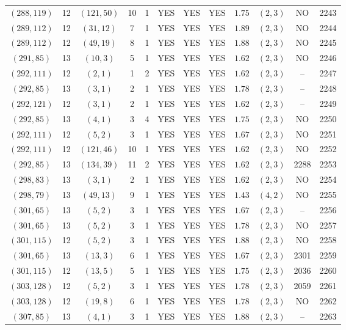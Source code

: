 \begin{longtable}{|c|c|c|c|c|c|c|c|c|c|c|c|}
$(288,119)$ & 12 & $(121,50)$ & 10 & 1 & YES & YES & YES & $1.75$ & $(2,3)$ & NO & 2243\\
$(289,112)$ & 12 & $(31,12)$ & 7 & 1 & YES & YES & YES & $1.89$ & $(2,3)$ & NO & 2244\\
$(289,112)$ & 12 & $(49,19)$ & 8 & 1 & YES & YES & YES & $1.88$ & $(2,3)$ & NO & 2245\\
$(291,85)$ & 13 & $(10,3)$ & 5 & 1 & YES & YES & YES & $1.62$ & $(2,3)$ & NO & 2246\\
$(292,111)$ & 12 & $(2,1)$ & 1 & 2 & YES & YES & YES & $1.62$ & $(2,3)$ & -- & 2247\\
$(292,85)$ & 13 & $(3,1)$ & 2 & 1 & YES & YES & YES & $1.78$ & $(2,3)$ & -- & 2248\\
$(292,121)$ & 12 & $(3,1)$ & 2 & 1 & YES & YES & YES & $1.62$ & $(2,3)$ & -- & 2249\\
$(292,85)$ & 13 & $(4,1)$ & 3 & 4 & YES & YES & YES & $1.75$ & $(2,3)$ & NO & 2250\\
$(292,111)$ & 12 & $(5,2)$ & 3 & 1 & YES & YES & YES & $1.67$ & $(2,3)$ & NO & 2251\\
$(292,111)$ & 12 & $(121,46)$ & 10 & 1 & YES & YES & YES & $1.62$ & $(2,3)$ & NO & 2252\\
$(292,85)$ & 13 & $(134,39)$ & 11 & 2 & YES & YES & YES & $1.62$ & $(2,3)$ & 2288 & 2253\\
$(298,83)$ & 13 & $(3,1)$ & 2 & 1 & YES & YES & YES & $1.62$ & $(2,3)$ & NO & 2254\\
$(298,79)$ & 13 & $(49,13)$ & 9 & 1 & YES & YES & YES & $1.43$ & $(4,2)$ & NO & 2255\\
$(301,65)$ & 13 & $(5,2)$ & 3 & 1 & YES & YES & YES & $1.67$ & $(2,3)$ & -- & 2256\\
$(301,65)$ & 13 & $(5,2)$ & 3 & 1 & YES & YES & YES & $1.78$ & $(2,3)$ & NO & 2257\\
$(301,115)$ & 12 & $(5,2)$ & 3 & 1 & YES & YES & YES & $1.88$ & $(2,3)$ & NO & 2258\\
$(301,65)$ & 13 & $(13,3)$ & 6 & 1 & YES & YES & YES & $1.67$ & $(2,3)$ & 2301 & 2259\\
$(301,115)$ & 12 & $(13,5)$ & 5 & 1 & YES & YES & YES & $1.75$ & $(2,3)$ & 2036 & 2260\\
$(303,128)$ & 12 & $(5,2)$ & 3 & 1 & YES & YES & YES & $1.78$ & $(2,3)$ & 2059 & 2261\\
$(303,128)$ & 12 & $(19,8)$ & 6 & 1 & YES & YES & YES & $1.78$ & $(2,3)$ & NO & 2262\\
$(307,85)$ & 13 & $(4,1)$ & 3 & 1 & YES & YES & YES & $1.88$ & $(2,3)$ & -- & 2263\\

\end{longtable}
